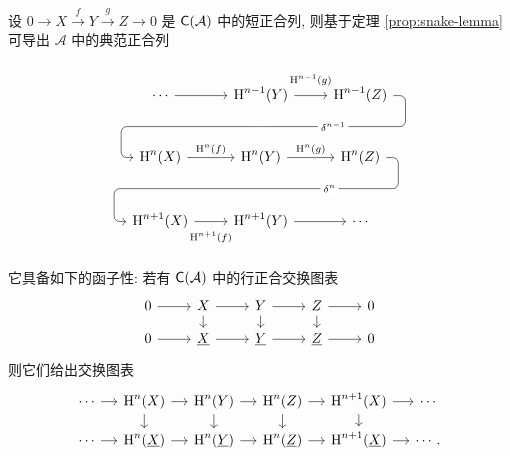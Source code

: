 \begin{proposition}[短正合列诱导长正合列]\label{prop:long-exact-sequence-ses}
	设 $0 \to X \xrightarrow{f} Y \xrightarrow{g} Z \to 0$ 是 $\mathsf{C}(\mathcal{A})$ 中的短正合列, 则基于定理 \ref{prop:snake-lemma} 可导出 $\mathcal{A}$ 中的典范正合列
	
	\begin{equation*}\begin{tikzcd}[row sep=large]
	\cdots \arrow[r] & \Hm^{n-1}(Y) \arrow[r, "{\Hm^{n-1}(g)}" inner sep=0.7em] \arrow[phantom, d, ""{coordinate, name=A}] & \Hm^{n-1}(Z) \arrow[dll, rounded corners, "{\delta^{n-1}}" description, to path={
		-- ([xshift=2ex]\tikztostart.east)
		|- (A) [near end]\tikztonodes
		-| ([xshift=-2ex]\tikztotarget.west)
		-- (\tikztotarget)}] \\
	\Hm^n(X) \arrow[r, "{\Hm^n(f)}"] & \Hm^n(Y) \arrow[r, "{\Hm^n(g)}"] \arrow[phantom, d, ""{coordinate, name=B}] & \Hm^n(Z) \arrow[dll, rounded corners, "{\delta^n}" description, to path={
		-- ([xshift=2ex]\tikztostart.east)
		|- (B) [near end]\tikztonodes
		-| ([xshift=-2ex]\tikztotarget.west)
		-- (\tikztotarget)}] \\
	\Hm^{n+1}(X) \arrow[r, "{\Hm^{n+1}(f)}"' inner sep=0.7em] & \Hm^{n+1}(Y) \arrow[r] & \cdots
	\end{tikzcd}\end{equation*}
	
	它具备如下的函子性: 若有 $\mathsf{C}(\mathcal{A})$ 中的行正合交换图表
	\[\begin{tikzcd}[row sep=small]
		0 \arrow[r] & X \arrow[r] \arrow[d] & Y \arrow[r] \arrow[d] & Z \arrow[d] \arrow[r] & 0 \\
		0 \arrow[r] & \underline{X} \arrow[r] & \underline{Y} \arrow[r] & \underline{Z} \arrow[r] & 0
	\end{tikzcd}\]
	则它们给出交换图表
	\[\begin{tikzcd}[column sep=small, row sep=small]
		\cdots \arrow[r] & \Hm^n(X) \arrow[d] \arrow[r] & \Hm^n(Y) \arrow[r] \arrow[d] & \Hm^n(Z) \arrow[r] \arrow[d] & \Hm^{n+1}(X) \arrow[r] \arrow[d] & \cdots \\
		\cdots \arrow[r] & \Hm^n(\underline{X}) \arrow[r] & \Hm^n(\underline{Y}) \arrow[r] & \Hm^n(\underline{Z}) \arrow[r] & \Hm^{n+1}(\underline{X}) \arrow[r] & \cdots .
	\end{tikzcd}\]
\end{proposition}
